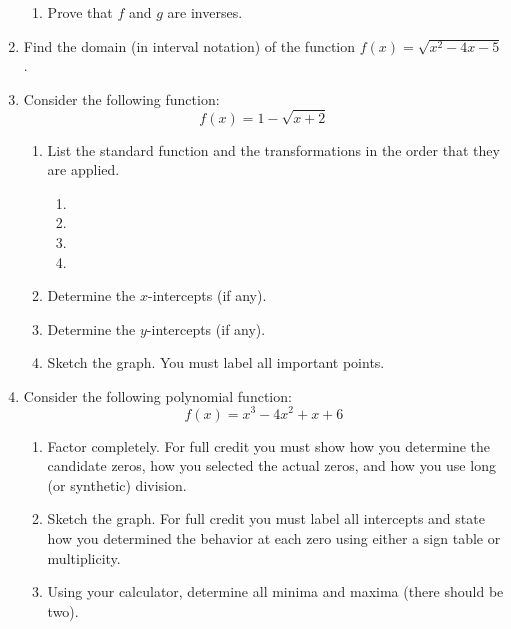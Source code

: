 \documentclass[letterpaper,12pt,fleqn]{article}
\begin{document}
\begin{enumerate}
\begin{enumerate}
  \item Prove that $f$ and $g$ are inverses.
    
    \vspace{3in}

  \end{enumerate}

\item Find the domain (in interval notation) of the function $f(x)=\sqrt{x^2-4x-5}$.

  \vspace{4in}

\item Consider the following function:
  \[f(x)=1-\sqrt{x+2}\]
  \begin{enumerate}
  \item List the standard function and the transformations in the order that they are
    applied.
    \begin{enumerate}
      \item
      \item
      \item
      \item
    \end{enumerate}

  \item Determine the $x$-intercepts (if any).

    \newpage

  \item Determine the $y$-intercepts (if any).
    
    \vspace{1in}

  \item Sketch the graph. You must label all important points.

    \vspace{4in}

  \end{enumerate}
  
  \newpage

\item Consider the following polynomial function:
  \[f(x)=x^3-4x^2+x+6\]
  \begin{enumerate}
  \item Factor completely. For full credit you must show how you determine the
    candidate zeros, how you selected the actual zeros, and how you use long (or
    synthetic) division.

    \newpage

  \item Sketch the graph. For full credit you must label all intercepts and state how
    you determined the behavior at each zero using either a sign table or multiplicity.

    \vspace{5in}

  \item Using your calculator, determine all minima and maxima (there should be two).
    
  \end{enumerate}
\end{enumerate}
\end{document}
